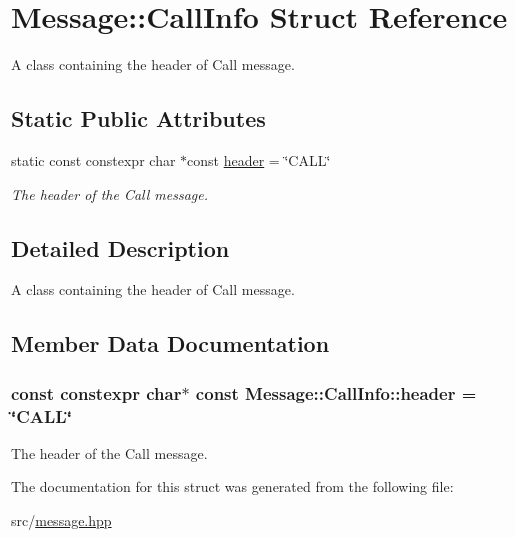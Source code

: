 \hypertarget{struct_message_1_1_call_info}{\section{Message\-:\-:Call\-Info Struct Reference}
\label{struct_message_1_1_call_info}
}


A class containing the header of Call message.  


\subsection*{Static Public Attributes}
\begin{DoxyCompactItemize}
\item 
static const constexpr char $\ast$const \hyperlink{struct_message_1_1_call_info_a8abd3d3a05a677da712bef3ad8bd99dd}{header} = \char`\"{}C\-A\-L\-L\char`\"{}
\begin{DoxyCompactList}\small\item\em The header of the Call message. \end{DoxyCompactList}\end{DoxyCompactItemize}


\subsection{Detailed Description}
A class containing the header of Call message. 

\subsection{Member Data Documentation}
\hypertarget{struct_message_1_1_call_info_a8abd3d3a05a677da712bef3ad8bd99dd}{
\subsubsection[{header}]{\setlength{\rightskip}{0pt plus 5cm}const constexpr char$\ast$ const Message\-::\-Call\-Info\-::header = \char`\"{}C\-A\-L\-L\char`\"{}\hspace{0.3cm}{\ttfamily [static]}}}\label{struct_message_1_1_call_info_a8abd3d3a05a677da712bef3ad8bd99dd}


The header of the Call message. 



The documentation for this struct was generated from the following file\-:\begin{DoxyCompactItemize}
\item 
src/\hyperlink{message_8hpp}{message.\-hpp}\end{DoxyCompactItemize}
